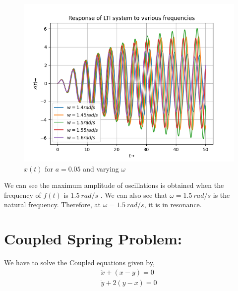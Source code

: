 \documentclass[11pt, a4paper]{article}
\begin{document}
        \begin{figure}[H]
            \centering
            \includegraphics[scale=0.8]{Figure_3.png}
            \caption{$x(t)$ for $a=0.05$ and varying $\omega$}
            \label{fig:Fig3}
        \end{figure}
        We can see the maximum amplitude of oscillations is obtained when the frequency of $f(t)$ is $1.5\ rad/s$ . We can also see that
         $\omega= 1.5\ rad/s$ is the natural frequency. Therefore, at
          $\omega= 1.5\ rad/s$, it is in resonance.

\section{Coupled Spring Problem:}
    We have to solve the Coupled equations given by, 
    \begin{gather*}
        \ddot{x} + (x-y) = 0\\
        \ddot{y} + 2(y-x) = 0
    \end{gather*}
\end{document}
